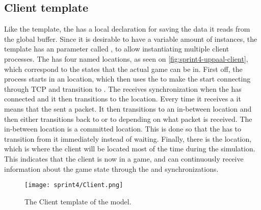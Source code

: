 \subsection*{Client template}
Like the  template, the  has a local declaration for saving the data it reads from the global buffer.
Since it is desirable to have a variable amount of instances, the template has an  parameter called , to allow instantiating multiple client processes.
The  has four named locations, as seen on \autoref{fig:sprint4-uppaal-client}, which correspond to the states that the actual game can be in.
First off, the process starts in an  location, which then uses the  to make the  start connecting through TCP and transition to .
The  receives  synchronization when the  has connected and it then transitions to the  location.
Every time it receives a  it means that the  sent a packet.
It then transitions to an in-between location and then either transitions back to  or to  depending on what packet is received.
The in-between location is a committed location.
This is done so that the  has to transition from it immediately instead of waiting.
Finally, there is the  location, which is where the client will be located most of the time during the simulation.
This indicates that the client is now in a game, and can continuously receive information about the game state through the  and  synchronizations.
\begin{figure}[h]
    \centering
    \texttt{[image: sprint4/Client.png]}
    \caption{The Client template of the \uppaal model.}
    \label{fig:sprint4-uppaal-client}
\end{figure}

